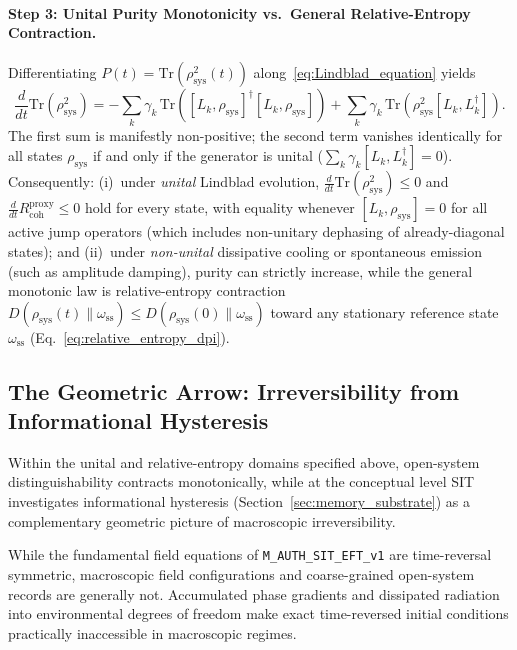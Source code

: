 \paragraph{Step 3: Unital Purity Monotonicity vs.\ General Relative-Entropy Contraction.}
Differentiating $P(t) = \mathrm{Tr}(\rho_{\mathrm{sys}}^2(t))$ along~\eqref{eq:Lindblad_equation} yields
\begin{equation}
    \frac{d}{dt} \mathrm{Tr}(\rho_{\mathrm{sys}}^2)
    = -\sum_k \gamma_k\,\mathrm{Tr}\!\left([L_k, \rho_{\mathrm{sys}}]^\dagger [L_k, \rho_{\mathrm{sys}}]\right)
      + \sum_k \gamma_k\,\mathrm{Tr}\!\left(\rho_{\mathrm{sys}}^2 [L_k, L_k^\dagger]\right).
    \label{eq:purity_decay}
\end{equation}
The first sum is manifestly non-positive; the second term vanishes identically for all states $\rho_{\mathrm{sys}}$ if and only if the generator is unital ($\sum_k \gamma_k [L_k, L_k^\dagger] = 0$). Consequently: (i)~under \emph{unital} Lindblad evolution, $\frac{d}{dt}\mathrm{Tr}(\rho_{\mathrm{sys}}^2) \le 0$ and $\frac{d}{dt}R_{\mathrm{coh}}^{\mathrm{proxy}} \le 0$ hold for every state, with equality whenever $[L_k, \rho_{\mathrm{sys}}] = 0$ for all active jump operators (which includes non-unitary dephasing of already-diagonal states); and (ii)~under \emph{non-unital} dissipative cooling or spontaneous emission (such as amplitude damping), purity can strictly increase, while the general monotonic law is relative-entropy contraction $D(\rho_{\mathrm{sys}}(t)\|\omega_{\mathrm{ss}}) \le D(\rho_{\mathrm{sys}}(0)\|\omega_{\mathrm{ss}})$ toward any stationary reference state $\omega_{\mathrm{ss}}$ (Eq.~\eqref{eq:relative_entropy_dpi}).

\subsection{The Geometric Arrow: Irreversibility from Informational Hysteresis}

Within the unital and relative-entropy domains specified above, open-system distinguishability contracts monotonically, while at the conceptual level SIT investigates informational hysteresis (Section~\ref{sec:memory_substrate}) as a complementary geometric picture of macroscopic irreversibility.

While the fundamental field equations of \texttt{M\_AUTH\_SIT\_EFT\_v1} are time-reversal symmetric, macroscopic field configurations and coarse-grained open-system records are generally not. Accumulated phase gradients and dissipated radiation into environmental degrees of freedom make exact time-reversed initial conditions practically inaccessible in macroscopic regimes.

